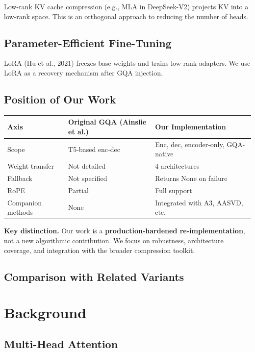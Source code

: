 Low-rank KV cache compression (e.g., MLA in DeepSeek-V2) projects KV into 
a low-rank space. This is an orthogonal approach to reducing the number of 
heads.

\subsection{Parameter-Efficient Fine-Tuning}

LoRA (Hu et al., 2021) freezes base weights and trains low-rank adapters. 
We use LoRA as a recovery mechanism after GQA injection.

\subsection{Position of Our Work}

\begin{table}[H]
\centering
\small
\begin{tabular}{lll}
\toprule
\textbf{Axis} & \textbf{Original GQA (Ainslie et al.)} & \textbf{Our Implementation} \\
\midrule
Scope & T5-based enc-dec & Enc, dec, encoder-only, GQA-native \\
Weight transfer & Not detailed & 4 architectures \\
Fallback & Not specified & Returns None on failure \\
RoPE & Partial & Full support \\
Companion methods & None & Integrated with A3, AASVD, etc. \\
\bottomrule
\end{tabular}
\end{table}

\textbf{Key distinction.} Our work is a \textbf{production-hardened re-implementation}, 
not a new algorithmic contribution. We focus on robustness, architecture 
coverage, and integration with the broader compression toolkit.

\subsection{Comparison with Related Variants}



\section{Background}

\subsection{Multi-Head Attention}

